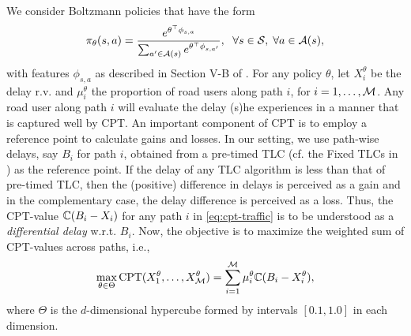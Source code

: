 We consider Boltzmann policies that have the form
$$
\pi_{\theta}(s,a) = \frac{e^{\theta^{\top} \phi_{s,a}}}{\sum_{a' \in {\mathcal{A}(s)}} e^{\theta^{\top} \phi_{s,a'}}},
\hspace{6pt} \forall s \in \mathcal{S},\;\forall a \in \mathcal{A}(s),
$$
with features $\phi_{s,a}$ as described in Section V-B of \cite{prashanth2012threshold}.
For any policy $\theta$, let $X_i^\theta$ be the delay r.v. and $\mu_i^\theta$ the proportion of road users along path $i$, for $i=1,\ldots,\mathcal{M}$. 
Any road user along path $i$ will evaluate the delay (s)he experiences in a manner that is captured well by CPT. 
An important component of CPT is to employ a reference point to calculate gains and losses. 
In our setting, we use path-wise delays, say $B_i$ for path $i$, obtained from a pre-timed TLC (cf. the Fixed TLCs in \cite{prashanth2011reinforcement}) as the reference point.
If the delay of any TLC algorithm is less than that of pre-timed TLC, then the (positive) difference in delays is perceived as a gain and in the complementary case, the delay difference is perceived as a loss. Thus, the CPT-value $\mathbb{C}(B_i-X_i)$ for any path $i$ in \eqref{eq:cpt-traffic} is to be understood as a \textit{differential delay} w.r.t. $B_i$.  
Now, the objective is to maximize the weighted sum of CPT-values across paths, i.e., 
\begin{align}
\max_{\theta \in \Theta} \text{CPT}(X_1^\theta,\ldots,X_{\mathcal{M}}^\theta) = \sum_{i=1}^{\mathcal{M}} \mu_i^\theta \mathbb{C}(B_i - X_i^\theta),\label{eq:cpt-traffic}
\end{align}
where $\Theta$ is the $d$-dimensional hypercube formed by intervals $[0.1,1.0]$ in each dimension.  

